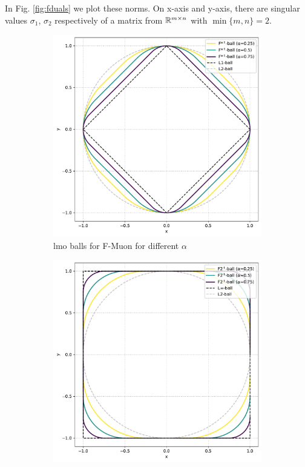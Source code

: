 \documentclass{article} %
\newcommand{\Rmn}{\R^{m\times n}}
\begin{document}
In Fig. \cref{fig:fduals} we plot these norms. On x-axis and y-axis, there are singular values $\sigma_1$, $\sigma_2$ respectively of a matrix from $\Rmn$ with $\min\{m,n\}=2$.

\begin{figure}[h!]
    \centering
    \begin{subfigure}[b]{0.48\linewidth}
        \centering
        \includegraphics[width=\linewidth]{figs/fstardualball.pdf}
        \caption{lmo balls for F-Muon for different $\alpha$}
        \label{fig:fstardual}
    \end{subfigure}
    \hfill
    \begin{subfigure}[b]{0.48\linewidth}
        \centering
        \includegraphics[width=\linewidth]{figs/ftwodualball.pdf}

\end{subfigure}
\end{figure}
\end{document}
